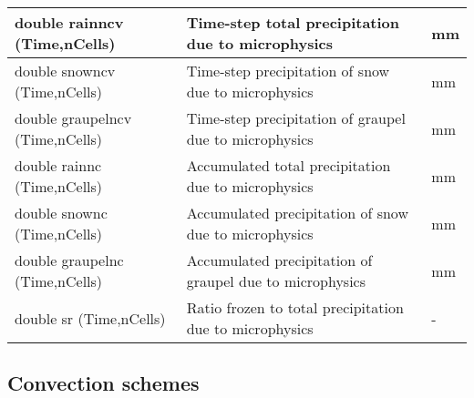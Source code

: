 {\small
\begin{longtable}{|p{2.0in} |p{3.5in} |p{0.5in} |}
\hline
        double rainncv (Time,nCells) & Time-step total precipitation due to microphysics & mm \\ \hline
        double snowncv (Time,nCells) & Time-step precipitation of snow due to microphysics & mm \\ \hline
        double graupelncv (Time,nCells) & Time-step precipitation of graupel due to microphysics & mm \\ \hline
        double rainnc (Time,nCells) & Accumulated total precipitation due to microphysics & mm \\ \hline
        double snownc (Time,nCells) & Accumulated precipitation of snow due to microphysics & mm \\ \hline
        double graupelnc (Time,nCells) & Accumulated precipitation of graupel due to microphysics & mm \\ \hline
        double sr (Time,nCells) & Ratio frozen to total precipitation due to microphysics & - \\ \hline
\end{longtable}
}

\subsection{Convection schemes}

